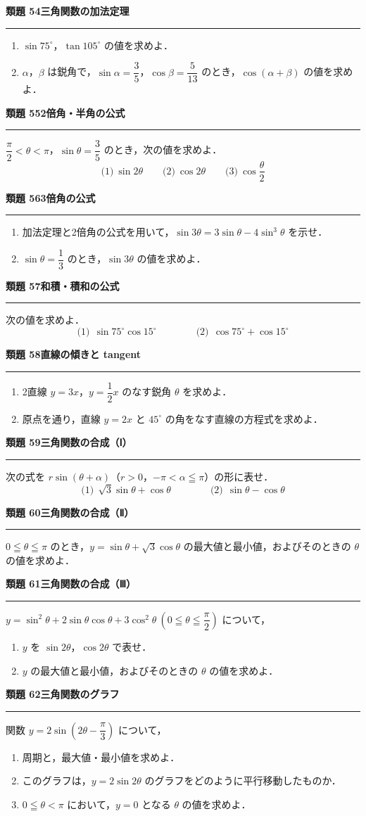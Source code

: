 \documentclass[a4paper,11pt]{ltjsarticle}
\newcommand{\mon}[2]{\Needspace{7\baselineskip}\vspace{10pt}%
  {\sffamily\bfseries 類題 #1\quad #2\par}\vspace{2pt}\hrule\vspace{4pt}}
\begin{document}
\mon{54}{三角関数の加法定理}
\begin{enumerate}
\item $\sin75^\circ$，$\tan105^\circ$ の値を求めよ．
\item $\alpha$，$\beta$ は鋭角で，$\sin\alpha=\dfrac35$，$\cos\beta=\dfrac5{13}$ のとき，$\cos(\alpha+\beta)$ の値を求めよ．
\end{enumerate}

\mon{55}{2倍角・半角の公式}
$\dfrac\pi2<\theta<\pi$，$\sin\theta=\dfrac35$ のとき，次の値を求めよ．
\[\text{(1)}\ \sin2\theta\qquad\text{(2)}\ \cos2\theta\qquad\text{(3)}\ \cos\frac\theta2\]

\mon{56}{3倍角の公式}
\begin{enumerate}
\item 加法定理と2倍角の公式を用いて，$\sin3\theta=3\sin\theta-4\sin^3\theta$ を示せ．
\item $\sin\theta=\dfrac13$ のとき，$\sin3\theta$ の値を求めよ．
\end{enumerate}

\mon{57}{和積・積和の公式}
次の値を求めよ．
\[\text{(1)}\ \ \sin75^\circ\cos15^\circ\qquad\qquad\text{(2)}\ \ \cos75^\circ+\cos15^\circ\]

\mon{58}{直線の傾きと tangent}
\begin{enumerate}
\item 2直線 $y=3x$，$y=\dfrac12x$ のなす鋭角 $\theta$ を求めよ．
\item 原点を通り，直線 $y=2x$ と $45^\circ$ の角をなす直線の方程式を求めよ．
\end{enumerate}

\mon{59}{三角関数の合成（Ⅰ）}
次の式を $r\sin(\theta+\alpha)$（$r>0$，$-\pi<\alpha\leqq\pi$）の形に表せ．
\[\text{(1)}\ \ \sqrt3\sin\theta+\cos\theta\qquad\qquad\text{(2)}\ \ \sin\theta-\cos\theta\]

\mon{60}{三角関数の合成（Ⅱ）}
$0\leqq\theta\leqq\pi$ のとき，$y=\sin\theta+\sqrt3\cos\theta$ の最大値と最小値，およびそのときの $\theta$ の値を求めよ．

\mon{61}{三角関数の合成（Ⅲ）}
$y=\sin^2\theta+2\sin\theta\cos\theta+3\cos^2\theta\ \left(0\leqq\theta\leqq\dfrac\pi2\right)$ について，
\begin{enumerate}
\item $y$ を $\sin2\theta$，$\cos2\theta$ で表せ．
\item $y$ の最大値と最小値，およびそのときの $\theta$ の値を求めよ．
\end{enumerate}

\mon{62}{三角関数のグラフ}
関数 $y=2\sin\left(2\theta-\dfrac\pi3\right)$ について，
\begin{enumerate}
\item 周期と，最大値・最小値を求めよ．
\item このグラフは，$y=2\sin2\theta$ のグラフをどのように平行移動したものか．
\item $0\leqq\theta<\pi$ において，$y=0$ となる $\theta$ の値を求めよ．
\end{enumerate}
\end{document}

